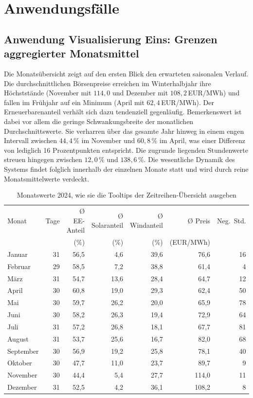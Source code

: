 \section{Anwendungsfälle}\label{sec:anwendungsfaelle}

\subsection{Anwendung Visualisierung Eins: Grenzen aggregierter Monatsmittel}\label{sec:anwendung1}

Die Monatsübersicht zeigt auf den ersten Blick den erwarteten saisonalen Verlauf. Die durchschnittlichen Börsenpreise erreichen im Winterhalbjahr ihre Höchststände (November mit $114{,}0$ und Dezember mit $108{,}2$\,EUR/MWh) und fallen im Frühjahr auf ein Minimum (April mit $62{,}4$\,EUR/MWh). Der Erneuerbarenanteil verhält sich dazu tendenziell gegenläufig. Bemerkenswert ist dabei vor allem die geringe Schwankungsbreite der monatlichen Durchschnittswerte. Sie verharren über das gesamte Jahr hinweg in einem engen Intervall zwischen $44{,}4\,\%$ im November und $60{,}8\,\%$ im April, was einer Differenz von lediglich 16 Prozentpunkten entspricht. Die zugrunde liegenden Stundenwerte streuen hingegen zwischen $12{,}0\,\%$ und $138{,}6\,\%$. Die wesentliche Dynamik des Systems findet folglich innerhalb der einzelnen Monate statt und wird durch reine Monatsmittelwerte verdeckt.

\begin{table}[H]
\centering\small
\caption{Monatswerte 2024, wie sie die Tooltips der Zeitreihen-Übersicht ausgeben}\label{tab:monate}
\begin{tabular}{@{}lrrrrrr@{}}
\toprule
Monat & Tage & Ø EE-Anteil & Ø Solaranteil & Ø Windanteil & Ø Preis & Neg.\ Std. \\
      &      & (\%)        & (\%)          & (\%)         & (EUR/MWh) & \\
\midrule
Januar    & 31 & 56{,}5 & 4{,}6  & 39{,}6 & 76{,}6  & 16 \\
Februar   & 29 & 58{,}5 & 7{,}2  & 38{,}8 & 61{,}4  & 4 \\
März      & 31 & 54{,}7 & 13{,}6 & 28{,}4 & 64{,}7  & 12 \\
April     & 30 & 60{,}8 & 19{,}0 & 29{,}3 & 62{,}4  & 50 \\
Mai       & 30 & 59{,}7 & 26{,}2 & 20{,}0 & 65{,}9  & 78 \\
Juni      & 30 & 58{,}2 & 26{,}3 & 19{,}4 & 72{,}9  & 64 \\
Juli      & 31 & 57{,}2 & 26{,}8 & 18{,}1 & 67{,}7  & 81 \\
August    & 31 & 53{,}7 & 25{,}6 & 16{,}7 & 82{,}0  & 68 \\
September & 30 & 56{,}9 & 19{,}2 & 25{,}8 & 78{,}1  & 40 \\
Oktober   & 30 & 47{,}7 & 11{,}0 & 23{,}7 & 89{,}7  & 9 \\
November  & 30 & 44{,}4 & 5{,}4  & 27{,}7 & 114{,}0 & 11 \\
Dezember  & 31 & 52{,}5 & 4{,}2  & 36{,}1 & 108{,}2 & 8 \\
\bottomrule
\end{tabular}
\end{table}


